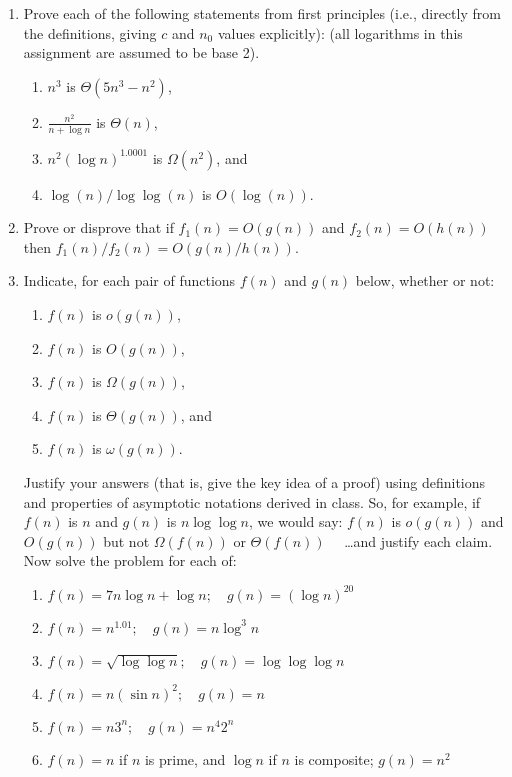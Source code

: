 \documentclass[12pt]{article}
\begin{document}
\begin{enumerate}
\item
Prove each of the following statements from first principles (i.e., directly from the definitions, giving $c$ and $n_0$ values explicitly):
(all logarithms in this assignment are assumed to be base 2).
\begin{enumerate}
\item  $n^3$ is $\Theta(5 n^3- n^2)$,
\item  $\frac{n^2}{n+\log n}$ is $\Theta(n)$,
\item  $n^2(\log n)^{1.0001}$ is $\Omega(n^2)$, and
\item  $\log(n)/\log\log(n)$ is $O(\log(n))$.
\end{enumerate}


\item Prove or disprove that if $f_1(n)=O(g(n))$ and $f_2(n)=O(h(n))$ then
$f_1(n)/f_2(n)=O(g(n)/h(n))$.

\item Indicate, for each pair of functions $f(n)$ and $g(n)$
below, whether or not:
\begin{enumerate}[I]
\item  $f(n)$ is $o(g(n))$,
\item  $f(n)$ is $O(g(n))$,
\item  $f(n)$ is $\Omega(g(n))$,
\item  $f(n)$ is $\Theta(g(n))$, and
\item  $f(n)$ is $\omega(g(n))$.
\end{enumerate}
Justify your answers (that is, give the key idea of a proof) using
definitions and properties of asymptotic notations derived in class.
So, for example, if $f(n)$  is $n$ and $g(n)$ is $n \log \log n$, we
would say: $f(n)$ is $o(g(n))$ and $O(g(n))$ but not $\Omega(f(n))$
or $\Theta(f(n)) \quad $ \ldots  and justify each claim.  Now solve the
problem for each of:
\begin{enumerate}
\item $f(n) = 7n \log n + \log n;\quad g(n) = (\log n)^{20}$
\item $f(n) = n^{1.01}; \quad g(n) = n \log^3 n $
\item $f(n) = \sqrt{\log\log n} ;\quad g(n) = \log \log \log n$
\item $f(n) = n (\sin n )^2;\quad g(n) = n$
\item $f(n) = n 3^n ;\quad g(n) = n^4 2^n$
\item $f(n) = n$  if $n$ is prime, and $\log n$ if $n$ is composite; $g(n) = n^2$
\end{enumerate}


\end{enumerate}
\end{document}
